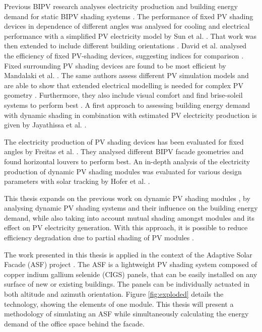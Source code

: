 	Previous BIPV research analyses electricity production and building energy demand for static BIPV shading systems \cite{sun2010, sun2012, David2011, mandalaki2012assessment, Mandalaki2014complexPV, mandalaki2014integrated, yoo2011available, jayathissa2015abs}. The performance of fixed PV shading devices in dependence of different angles was analysed for cooling and electrical performance with a simplified PV electricity model by Sun et al. \cite{sun2010}. That work was then extended to include different building orientations \cite{sun2012} . David et al. analysed the efficiency of fixed PV-shading devices, suggesting indices for comparison \cite{David2011}. Fixed surrounding PV shading devices are found to be most efficient by Mandalaki et al. \cite{mandalaki2012assessment}. The same authors assess different PV simulation models and are able to show that extended electrical modelling is needed for complex PV geometry \cite{Mandalaki2014complexPV}. Furthermore, they also include visual comfort and find brise-soleil systems to perform best \cite{mandalaki2014integrated}. A first approach to assessing building energy demand with dynamic shading in combination with estimated PV electricity production is given by Jayathissa et al. \cite{jayathissa2015abs}. 

	The electricity production of PV shading devices has been evaluated for fixed angles by Freitas et al. \cite{freitas2015maximizing}. They analysed different BIPV facade geometries and found horizontal louvers to perform best. An in-depth analysis of the electricity production of dynamic PV shading modules was evaluated for various design parameters with solar tracking by Hofer et al. \cite{hofer2016}. 

	This thesis expands on the previous work on dynamic PV shading modules \cite{jayathissa2015abs, hofer2016}, by analysing dynamic PV shading systems and their influence on the building energy demand, while also taking into account mutual shading amongst modules and its effect on PV electricity generation. With this approach, it is possible to reduce efficiency degradation due to partial shading of PV modules \cite{hofer2016}.

	The work presented in this thesis is applied in the context of the Adaptive Solar Facade (ASF) project \cite{nagy2016}. The ASF is a lightweight PV shading system composed of copper indium gallium selenide (CIGS) panels, that can be easily installed on any surface of new or existing buildings. The panels can be individually actuated in both altitude and azimuth orientation. Figure \ref{fig:exploded} details the technology, showing the elements of one module. This thesis will present a methodology of simulating an ASF while simultaneously calculating the energy demand of the office space behind the facade.

